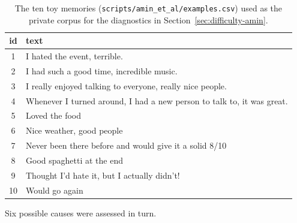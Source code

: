 \begin{table}[t]
\centering
\begin{tabular}{@{}cl@{}}
\toprule
\textbf{id} & \textbf{text} \\
\midrule
1  & I hated the event, terrible. \\
2  & I had such a good time, incredible music. \\
3  & I really enjoyed talking to everyone, really nice people. \\
4  & Whenever I turned around, I had a new person to talk to, it was great. \\
5  & Loved the food \\
6  & Nice weather, good people \\
7  & Never been there before and would give it a solid 8/10 \\
8  & Good spaghetti at the end \\
9  & Thought I'd hate it, but I actually didn't! \\
10 & Would go again \\
\bottomrule
\end{tabular}
\caption{The ten toy memories (\texttt{scripts/amin\_et\_al/examples.csv}) used as the private corpus for the diagnostics in Section~\ref{sec:difficulty-amin}.}
\label{tab:toy-fixture}
\end{table}

Six possible causes were assessed in turn.

